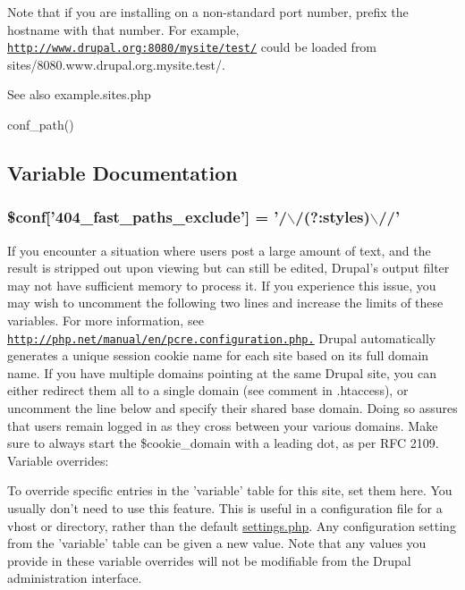 Note that if you are installing on a non-\/standard port number, prefix the hostname with that number. For example, \href{http://www.drupal.org:8080/mysite/test/}{\tt http://www.drupal.org:8080/mysite/test/} could be loaded from sites/8080.www.drupal.org.mysite.test/.

\begin{DoxySeeAlso}{See also}
example.sites.php 

conf\_\-path() 
\end{DoxySeeAlso}


\subsection{Variable Documentation}
\hypertarget{settings_8php_ad6ddcdefc93f69592fa04339ffd242c4}{
\subsubsection[{\$conf}]{\setlength{\rightskip}{0pt plus 5cm}\$conf\mbox{[}'404\_\-fast\_\-paths\_\-exclude'\mbox{]} = '/$\backslash$/(?:styles)$\backslash$//'}}
\label{settings_8php_ad6ddcdefc93f69592fa04339ffd242c4}
If you encounter a situation where users post a large amount of text, and the result is stripped out upon viewing but can still be edited, Drupal's output filter may not have sufficient memory to process it. If you experience this issue, you may wish to uncomment the following two lines and increase the limits of these variables. For more information, see \href{http://php.net/manual/en/pcre.configuration.php.}{\tt http://php.net/manual/en/pcre.configuration.php.} Drupal automatically generates a unique session cookie name for each site based on its full domain name. If you have multiple domains pointing at the same Drupal site, you can either redirect them all to a single domain (see comment in .htaccess), or uncomment the line below and specify their shared base domain. Doing so assures that users remain logged in as they cross between your various domains. Make sure to always start the \$cookie\_\-domain with a leading dot, as per RFC 2109. Variable overrides:

To override specific entries in the 'variable' table for this site, set them here. You usually don't need to use this feature. This is useful in a configuration file for a vhost or directory, rather than the default \hyperlink{settings_8php}{settings.php}. Any configuration setting from the 'variable' table can be given a new value. Note that any values you provide in these variable overrides will not be modifiable from the Drupal administration interface.

